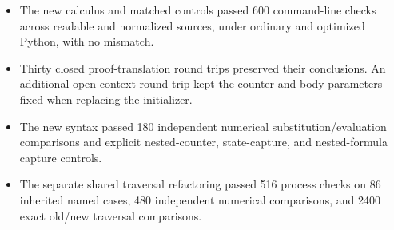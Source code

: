 \begin{itemize}
\item The new calculus and matched controls passed 600 command-line
checks across readable and normalized sources, under ordinary and
optimized Python, with no mismatch.
\item Thirty closed proof-translation round trips preserved their
conclusions. An additional open-context round trip kept the counter
and body parameters fixed when replacing the initializer.
\item The new syntax passed 180 independent numerical
substitution/evaluation comparisons and explicit nested-counter,
state-capture, and nested-formula capture controls.
\item The separate shared traversal refactoring passed 516 process
checks on 86 inherited named cases, 480 independent numerical
comparisons, and 2400 exact old/new traversal comparisons.
\end{itemize}
